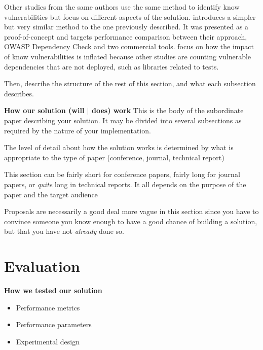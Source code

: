 \documentclass[pdf,bookmarks,colorlinks=true]{IEEEtran}
\begin{document}
Other studies from the same authors use the same method to identify know vulnerabilities but focus on different aspects of the solution. \cite{Plate2015} introduces a simpler but very similar method to the one previously described. It was presented as a proof-of-concept and targets performance comparison between their approach, OWASP Dependency Check and two commercial tools.  \cite{pashchenko2018esem} focus on how the impact of know vulnerabilities is inflated because other studies are counting vulnerable dependencies that are not deployed, such as libraries related to tests. 

Then, describe the structure of the rest of this section, and what each
subsection describes. \cite{Plate2015}

\textbf{How our solution (will $|$ does) work}
This is the body of the subordinate paper describing your solution. It
may be divided into several subsections as required by the nature of your
implementation.

The level of detail about how the solution works is determined by what
is appropriate to the type of paper (conference, journal, technical report)

This section can be fairly short for conference papers, fairly long for
journal papers, or {\em quite} long in technical reports. It all depends on the
purpose of the paper and the target audience

Proposals are necessarily a good deal more vague in this section since
you have to convince someone you know enough to have a good chance of building
a solution, but that you have not {\em already} done so.



\section{Evaluation}
\label{sec:Evaluation}

\textbf{How we tested our solution}
\begin{itemize}
\item   Performance metrics
\item   Performance parameters
\item   Experimental design
\end{itemize}
\end{document}
